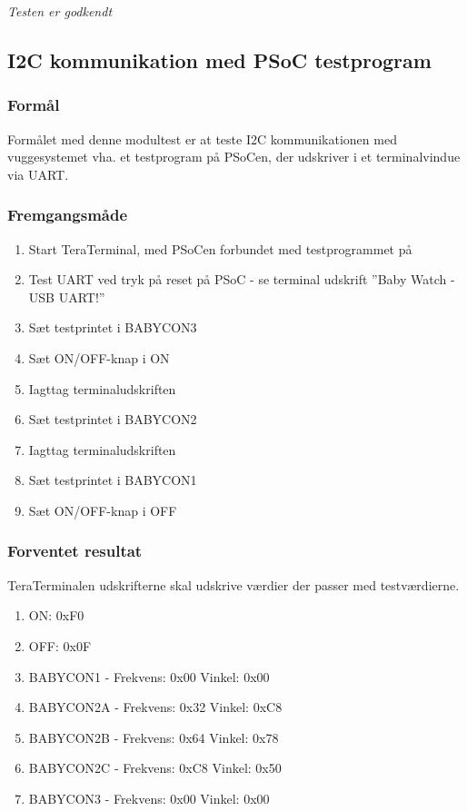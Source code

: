 \textit{Testen er godkendt}

\subsection*{I2C kommunikation med PSoC testprogram}

\subsubsection*{Formål}
Formålet med denne modultest er at teste I2C kommunikationen med vuggesystemet vha. et testprogram på PSoCen, der udskriver i et terminalvindue via UART.

\subsubsection*{Fremgangsmåde}
\begin{enumerate}
\item Start TeraTerminal, med PSoCen forbundet med testprogrammet på
\item Test UART ved tryk på reset på PSoC - se terminal udskrift ''Baby Watch - USB UART!''
\item Sæt testprintet i BABYCON3
\item Sæt ON/OFF-knap i ON
\item Iagttag terminaludskriften
\item Sæt testprintet i BABYCON2 
\item Iagttag terminaludskriften
\item Sæt testprintet i BABYCON1
\item Sæt ON/OFF-knap i OFF
\end{enumerate}

\subsubsection*{Forventet resultat} 
TeraTerminalen udskrifterne skal udskrive værdier der passer med testværdierne.
\begin{enumerate}
\item ON:  0xF0
\item OFF: 0x0F
\item BABYCON1 -  Frekvens: 0x00 Vinkel: 0x00
\item BABYCON2A - Frekvens: 0x32 Vinkel: 0xC8
\item BABYCON2B - Frekvens: 0x64 Vinkel: 0x78
\item BABYCON2C - Frekvens: 0xC8 Vinkel: 0x50
\item BABYCON3 -  Frekvens: 0x00 Vinkel: 0x00
\end{enumerate}

